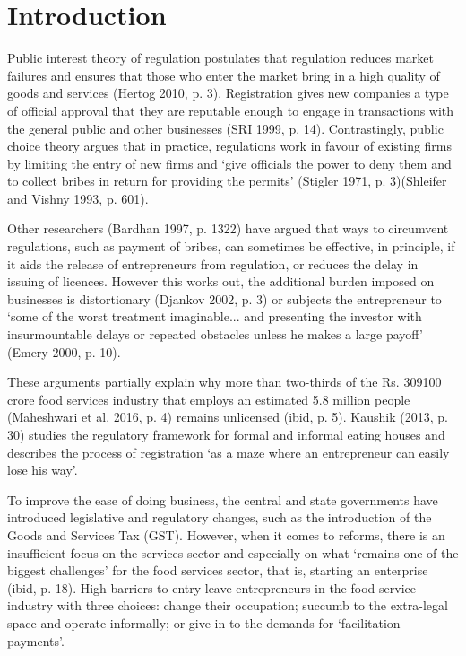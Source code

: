 \documentclass[a4paper, 12pt]{article}
\begin{document}
                    \newpage
                    \section{Introduction}
                    \label{intro}
                    Public interest theory of regulation postulates that regulation reduces market failures and ensures that those who enter the market bring in a high quality of goods and services (Hertog 2010, p. 3). Registration gives new companies a type of official 
approval that they are reputable enough to engage in transactions with the general public and other businesses (SRI 1999, p. 14). Contrastingly, public choice theory argues that in practice, regulations work in favour of existing firms by limiting the entry of new firms 
and ‘give officials the power to deny them and to collect bribes in return for providing the permits’ (Stigler 1971, p. 3)(Shleifer and Vishny 1993, p. 601). %
                    
                    Other researchers (Bardhan 1997, p. 1322) have argued that ways to circumvent regulations, such as payment of bribes, can sometimes be effective, in principle, if it aids the release of entrepreneurs from regulation, or reduces the delay in issuing of 
licences. However this works out, the additional burden imposed on businesses is distortionary (Djankov 2002, p. 3) or subjects the entrepreneur to ‘some of the worst treatment imaginable... and presenting the investor with insurmountable delays or repeated 
obstacles unless he makes a large payoff’ (Emery 2000, p. 10). 
                    
                    These arguments partially explain why more than two-thirds of the Rs. 309100 crore food services industry that employs an estimated 5.8 million people (Maheshwari et al. 2016, p. 4) remains unlicensed (ibid, p. 5). Kaushik (2013, p. 30) studies the 
regulatory framework for formal and informal eating houses and describes the process of registration ‘as a maze where an entrepreneur can easily lose his way’. 
                    
                    To improve the ease of doing business, the central and state governments have introduced legislative and regulatory changes, such as the introduction of the Goods and Services Tax (GST). However, when it comes to reforms, there is an insufficient 
focus on the services sector and especially on what ‘remains one of the biggest challenges’ for the food services sector, that is, starting an enterprise (ibid, p. 18). High barriers to entry leave entrepreneurs in the food service industry with three choices: change their 
occupation; succumb to the extra-legal space and operate informally; or give in to the demands for ‘facilitation payments’.
                    
\end{document}
